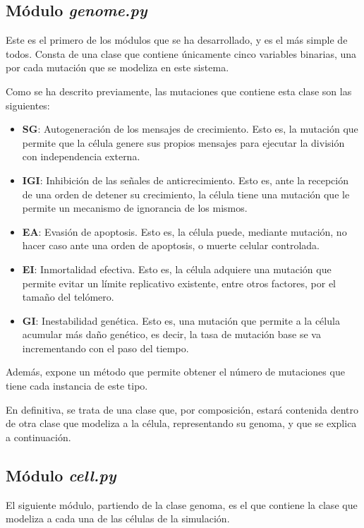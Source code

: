 \subsection{Módulo \textit{genome.py}}

Este es el primero de los módulos que se ha desarrollado, y es el más simple de todos. Consta de
una clase que contiene únicamente cinco variables binarias, una por cada mutación que se
modeliza en este sistema.

Como se ha descrito previamente, las mutaciones que contiene esta clase son las siguientes:

\begin{itemize}
    \item \textbf{SG}: Autogeneración de los mensajes de crecimiento. Esto es, la mutación que permite que la
    célula genere sus propios mensajes para ejecutar la división con independencia externa.
    \item \textbf{IGI}: Inhibición de las señales de anticrecimiento. Esto es, ante la recepción de una orden
    de detener su crecimiento, la célula tiene una mutación que le permite un mecanismo de ignorancia de los mismos.
    \item \textbf{EA}: Evasión de apoptosis. Esto es, la célula puede, mediante mutación, no hacer caso ante
    una orden de apoptosis, o muerte celular controlada.
    \item \textbf{EI}: Inmortalidad efectiva. Esto es, la célula adquiere una mutación que permite evitar un límite
    replicativo existente, entre otros factores, por el tamaño del telómero.
    \item \textbf{GI}: Inestabilidad genética. Esto es, una mutación que permite a la célula acumular más daño genético, es decir,
    la tasa de mutación base se va incrementando con el paso del tiempo.
\end{itemize}

Además, expone un método que permite obtener el número de mutaciones que tiene cada instancia
de este tipo.

En definitiva, se trata de una clase que, por composición, estará contenida dentro de otra clase
que modeliza a la célula, representando su genoma, y que se explica a continuación.

\subsection{Módulo \textit{cell.py}}

El siguiente módulo, partiendo de la clase genoma, es el que contiene la clase que modeliza
a cada una de las células de la simulación.

